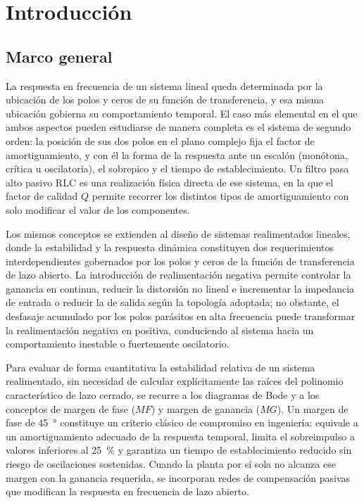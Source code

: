 \chapter{Introducción}

\section{Marco general}

La respuesta en frecuencia de un sistema lineal queda determinada por la ubicación de los polos y ceros de su
función de transferencia, y esa misma ubicación gobierna su comportamiento temporal. El caso más elemental en
el que ambos aspectos pueden estudiarse de manera completa es el sistema de segundo orden: la posición de sus
dos polos en el plano complejo fija el factor de amortiguamiento, y con él la forma de la respuesta ante un
escalón (monótona, crítica u oscilatoria), el sobrepico y el tiempo de establecimiento. Un filtro pasa alto
pasivo RLC es una realización física directa de ese sistema, en la que el factor de calidad $Q$ permite
recorrer los distintos tipos de amortiguamiento con solo modificar el valor de los componentes.

Los mismos conceptos se extienden al diseño de sistemas realimentados lineales, donde la estabilidad y la
respuesta dinámica constituyen dos requerimientos interdependientes gobernados por los polos y ceros de la
función de transferencia de lazo abierto. La introducción de realimentación negativa permite controlar la
ganancia en continua, reducir la distorsión no lineal e incrementar la impedancia de entrada o reducir la de
salida según la topología adoptada; no obstante, el desfasaje acumulado por los polos parásitos en alta
frecuencia puede transformar la realimentación negativa en positiva, conduciendo al sistema hacia un
comportamiento inestable o fuertemente oscilatorio.

Para evaluar de forma cuantitativa la estabilidad relativa de un sistema realimentado, sin necesidad de
calcular explícitamente las raíces del polinomio característico de lazo cerrado, se recurre a los diagramas de
Bode y a los conceptos de margen de fase ($MF$) y margen de ganancia ($MG$). Un margen de fase de
\qty{45}{\degree} constituye un criterio clásico de compromiso en ingeniería: equivale a un amortiguamiento
adecuado de la respuesta temporal, limita el sobreimpulso a valores inferiores al \qty{25}{\percent} y
garantiza un tiempo de establecimiento reducido sin riesgo de oscilaciones sostenidas. Cuando la planta por
sí sola no alcanza ese margen con la ganancia requerida, se incorporan redes de compensación pasivas que
modifican la respuesta en frecuencia de lazo abierto.

